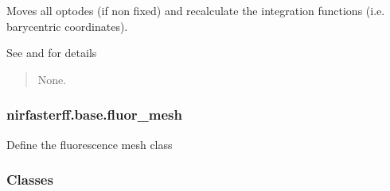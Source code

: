 \documentclass[letterpaper,10pt,english]{sphinxmanual}
\begin{document}
\begin{fulllineitems}

\begin{fulllineitems}
\label{\detokenize{_autosummary/nirfasterff.base.dcs_mesh.dcsmesh:nirfasterff.base.dcs_mesh.dcsmesh.touch_optodes}}
\pysigstartsignatures
{}
\pysigstopsignatures
\sphinxAtStartPar
Moves all optodes (if non fixed) and recalculate the integration functions (i.e. barycentric coordinates).

\sphinxAtStartPar
See {\hyperref[\detokenize{_autosummary/nirfasterff.base.optodes.optode:nirfasterff.base.optodes.optode.touch_sources}]{}} and {\hyperref[\detokenize{_autosummary/nirfasterff.base.optodes.optode:nirfasterff.base.optodes.optode.touch_detectors}]{}} for details
\begin{quote}\begin{description}
\sphinxAtStartPar
None.

\end{description}\end{quote}

\end{fulllineitems}


\end{fulllineitems}


\sphinxstepscope


\subsubsection{nirfasterff.base.fluor\_mesh}
\label{\detokenize{_autosummary/nirfasterff.base.fluor_mesh:module-nirfasterff.base.fluor_mesh}}\label{\detokenize{_autosummary/nirfasterff.base.fluor_mesh:nirfasterff-base-fluor-mesh}}\label{\detokenize{_autosummary/nirfasterff.base.fluor_mesh::doc}}
\sphinxAtStartPar
Define the fluorescence mesh class
\subsubsection*{Classes}
\end{document}
